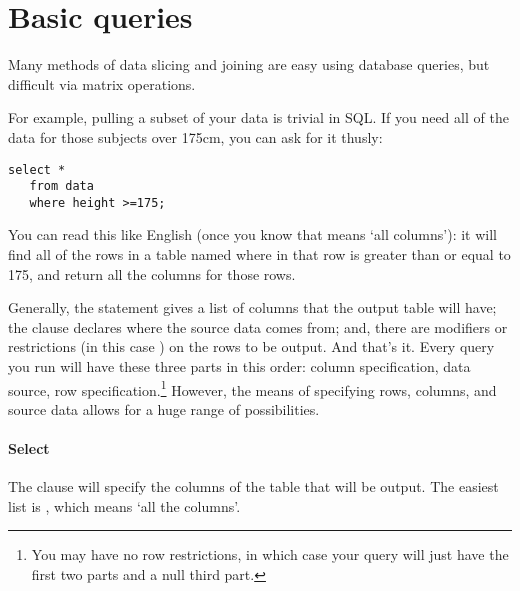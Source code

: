 

\section{Basic queries}
Many methods of data slicing and joining are easy using database queries,
but difficult via matrix operations.

For example, pulling a subset of your data is trivial in SQL. If
you need all of the data for those subjects over 175cm, you can ask for
it thusly:
\begin{lstlisting}
select * 
   from data 
   where height >=175;
\end{lstlisting}

You can read this like English (once you know that \sinline{*} means `all
columns'): it will find all of the rows in a table named 
where  in that row is greater than or equal to 175, and
return all the columns for those rows.


Generally, the  statement gives a list of columns that
the output table will have; the  clause declares where the
source data comes from; and, there are modifiers or restrictions
(in this case ) on the rows to be output.  And that's
it. Every query you run will have these three parts in this order: column
specification, data source, row specification.\footnote{You may have no
row restrictions, in which case your query will just have the first two
parts and a null third part.} However, the means of specifying rows,
columns, and source data allows for a huge range of possibilities.

\paragraph{Select}
The  clause will specify the columns of the table that will
be output. The easiest list is \sinline{*}, which means `all the columns'.


